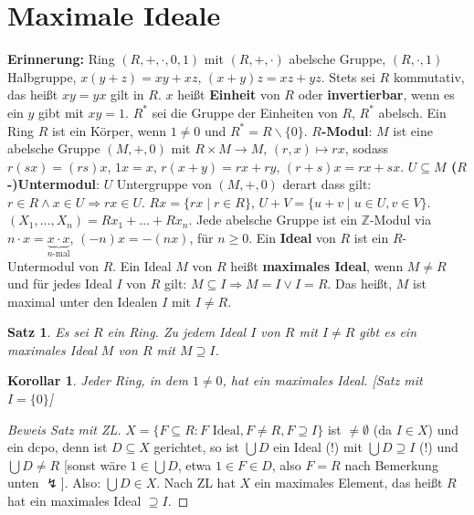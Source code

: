 \documentclass[headsepline=true,DIV=11]{scrartcl}
\newtheorem*{theorem}{Satz}
\newtheorem*{corollary}{Korollar}
\theoremstyle{definition}
\newenvironment{gelaber}{}{}
\begin{document}
\section{Maximale Ideale}

\begin{gelaber}
  {\bf Erinnerung:} Ring $(R,+,\cdot,0,1)$ mit $(R,+,\cdot)$ abelsche Gruppe, $(R,\cdot,1)$ Halbgruppe, $x(y+z)=xy+xz$, $(x+y)z=xz+yz$. Stets sei $R$
  kommutativ, das heißt $xy=yx$ gilt in $R$. $x$ heißt {\bf Einheit} von $R$ oder {\bf invertierbar}, wenn es ein $y$ gibt mit $xy=1$. $R^*$ sei die
  Gruppe der Einheiten von $R$, $R^*$ abelsch. Ein Ring $R$ ist ein Körper, wenn $1\neq 0$ und $R^*=R\backslash\{0\}$. {\bf $R$-Modul}: $M$ ist eine
  abelsche Gruppe $(M,+,0)$ mit $R\times M\rightarrow M$, $(r,x)\mapsto rx$, sodass $r(sx)=(rs)x$, $1x=x$, $r(x+y)=rx+ry$, $(r+s)x=rx+sx$. {\bf
    $U\subseteq M$ ($R$-)Untermodul}: $U$ Untergruppe von $(M,+,0)$ derart dass gilt: $r\in R \land x\in U\Rightarrow rx\in U$. $Rx=\{rx\mid r\in R\}$,
  $U+V=\{u+v\mid u\in U, v\in V\}$. $(X_1,\ldots,X_n)=Rx_1+\ldots+Rx_n$. Jede abelsche Gruppe ist ein $\mathbb{Z}$-Modul via $n\cdot
  x=\underbrace{x\cdot x}_{n\mbox{-mal}}$, $(-n)x=-(nx)$, für $n\ge 0$. Ein {\bf Ideal} von $R$ ist ein $R$-Untermodul von $R$. Ein Ideal $M$ von $R$
  heißt {\bf maximales Ideal}, wenn $M\neq R$ und für jedes Ideal $I$ von $R$ gilt: $M\subseteq I \Rightarrow M=I \vee I=R$. Das heißt, $M$ ist
  maximal unter den Idealen $I$ mit $I\neq R$.
\end{gelaber}

\begin{theorem}
  Es sei $R$ ein Ring. Zu jedem Ideal $I$ von $R$ mit $I\neq R$ gibt es ein maximales Ideal $M$ von $R$ mit $M\supseteq I$.
\end{theorem}

\begin{corollary}
  Jeder Ring, in dem $1\neq 0$, hat ein maximales Ideal. [Satz mit $I=\{0\}$]
\end{corollary}

\begin{proof}[Beweis Satz mit ZL]
$X=\{F\subseteq R:F\mbox{ Ideal}, F\neq R, F\supseteq I\}$ ist $\neq\emptyset$ (da $I\in X$) und ein dcpo, denn ist $D\subseteq X$ gerichtet, so ist
  $\bigcup D$ ein Ideal (!) mit $\bigcup D\supseteq I$ (!) und $\bigcup D\neq R$ [sonst wäre $1\in \bigcup D$, etwa $1\in F\in D$, also $F=R$ nach
    Bemerkung unten $\lightning$]. Also: $\bigcup D\in X$. Nach ZL hat $X$ ein maximales Element, das heißt $R$ hat ein maximales Ideal $\supseteq I$.
\end{proof}
\end{document}
